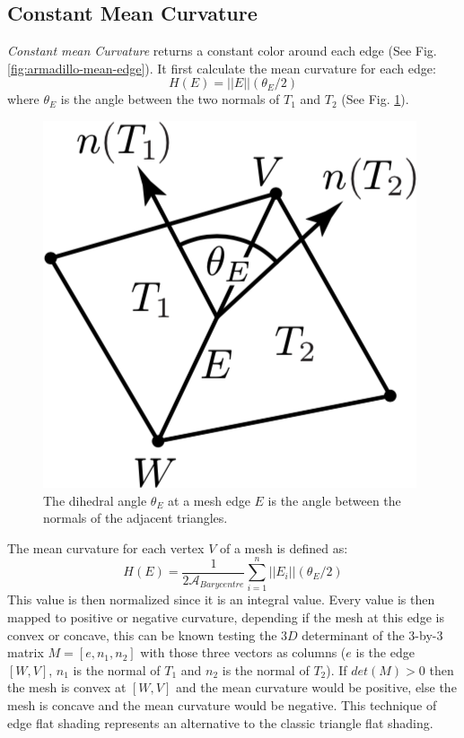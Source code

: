 \subsection{Constant Mean Curvature}
\textit{Constant mean Curvature} returns a constant color around each edge (See Fig. \ref{fig:armadillo-mean-edge}). It first calculate the mean curvature for each edge:
$$H(E) = || E|| (\theta_E /2)$$
where $\theta_E$ is the angle between the two normals of $T_1$ and $T_2$ (See Fig. \ref{fig:mean-edge}).
\begin{figure}[H]
    \centering
    \includegraphics[scale=0.6]{images/mean-edge-theta.png}
    \caption{The dihedral angle $\theta_E$ at a mesh edge $E$ is the angle between the normals of the adjacent triangles. \cite{geometryprocessing}}\label{fig:mean-edge}
\end{figure}
The mean curvature for each vertex $V$ of a mesh is defined as:
$$H(E) = \frac{1}{2\mathcal{A}_{Barycentre}} \sum_{i = 1}^n ||E_i||(\theta_E/2)$$
This value is then normalized since it is an integral value. Every value is then mapped to positive or negative curvature, depending if the mesh at this edge is convex or concave, this can be known testing the $3D$ determinant of the 3-by-3 matrix $M = [e, n_1, n_2]$ with those three vectors as
columns ($e$ is the edge $[W, V]$, $n_1$ is the normal of $T_1$ and $n_2$ is the normal of $T_2$). If $det(M) > 0$ then the mesh is convex at $[W, V]$ and the mean curvature would be positive, else the mesh is concave and the mean curvature would be negative. This technique of edge flat shading represents an alternative to the classic triangle flat shading.

